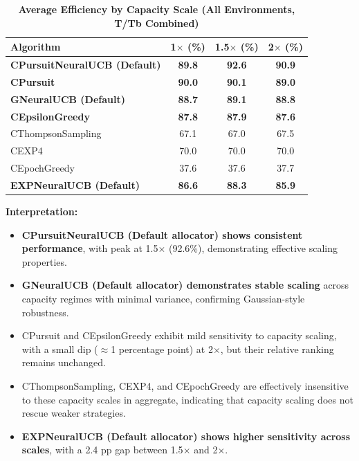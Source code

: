 \documentclass[12pt,a4paper]{article}
\newcommand{\performance}[1]{\textcolor{performancecolor}{\textbf{#1}}}
\newcommand{\legacy}[1]{\textcolor{legacycolor}{\textbf{#1}}}
\newcommand{\neural}[1]{\textcolor{neuralcolor}{\textbf{#1}}}
\begin{document}
\begin{table}[H]
\centering
\caption{\performance{Average Efficiency by Capacity Scale (All Environments, T/Tb Combined)}}
\begin{tabular}{|l|c|c|c|}
\hline
\textbf{Algorithm} & \textbf{1$\times$ (\%)} & \textbf{1.5$\times$ (\%)} & \textbf{2$\times$ (\%)} \\
\hline
\hline
\neural{CPursuitNeuralUCB (Default)}   & \neural{89.8}     & \neural{92.6}     & \neural{90.9} \\
\performance{CPursuit}                 & \performance{90.0} & \performance{90.1} & \performance{89.0} \\
\neural{GNeuralUCB (Default)}          & \neural{88.7}     & \neural{89.1}     & \neural{88.8} \\
\performance{CEpsilonGreedy}           & \performance{87.8} & \performance{87.9} & \performance{87.6} \\
CThompsonSampling                      & 67.1              & 67.0              & 67.5 \\
CEXP4                                  & 70.0              & 70.0              & 70.0 \\
CEpochGreedy                           & 37.6              & 37.6              & 37.7 \\
\legacy{EXPNeuralUCB (Default)}        & \legacy{86.6}     & \legacy{88.3}     & \legacy{85.9} \\
\hline
\end{tabular}
\end{table}

\textbf{Interpretation:}
\begin{itemize}
\item \neural{CPursuitNeuralUCB (Default allocator) shows consistent performance}, with peak at 1.5$\times$ (92.6\%), demonstrating effective scaling properties.
\item \neural{GNeuralUCB (Default allocator) demonstrates stable scaling} across capacity regimes with minimal variance, confirming Gaussian-style robustness.
\item CPursuit and CEpsilonGreedy exhibit mild sensitivity to capacity scaling, with a small dip ($\approx$1 percentage point) at 2$\times$, but their relative ranking remains unchanged.
\item CThompsonSampling, CEXP4, and CEpochGreedy are effectively insensitive to these capacity scales in aggregate, indicating that capacity scaling does not rescue weaker strategies.
\item \legacy{EXPNeuralUCB (Default allocator) shows higher sensitivity across scales}, with a 2.4 pp gap between 1.5$\times$ and 2$\times$.
\end{itemize}
\end{document}
